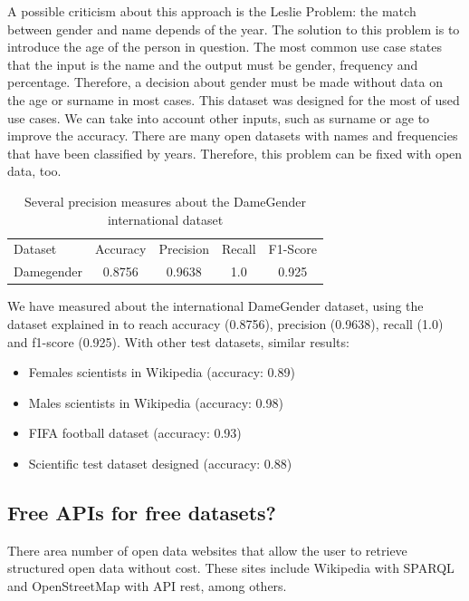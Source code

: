 \documentclass[a4paper]{article}
\begin{document}
A possible criticism about this approach is the Leslie
Problem\cite{blevins2015jane}: the match between gender and name
depends of the year. The solution to this problem is to introduce the
age of the person in question. The most common use case states that
the input is the name and the output must be gender, frequency and
percentage. Therefore, a decision about gender must be made without
data on the age or surname in most cases. This dataset was designed for
the most of used use cases. We can take into account other inputs,
such as surname or age to improve the accuracy. There are many open
datasets with names and frequencies that have been classified by years.
Therefore, this problem can be fixed with open data, too.

\begin{table}[t]
\footnotesize
\begin{tabular}[]{lcccc}
  \hline
  Dataset  & Accuracy & Precision & Recall & F1-Score  \tabularnewline
  Damegender &  0.8756  & 0.9638    & 1.0    & 0.925  \tabularnewline
  \hline
\end{tabular}
\caption{Several precision measures about the DameGender international dataset}
\label{table:DifferentAccuracyMeasures}
\end{table}

We have measured about the international DameGender dataset,
using the dataset explained in
\cite{10.7717/peerj-cs.156} to reach accuracy (0.8756), precision
(0.9638), recall (1.0) and f1-score (0.925). With other test datasets,
similar results:

\begin{itemize}
\item Females scientists in Wikipedia (accuracy: 0.89)
\item Males scientists in Wikipedia (accuracy: 0.98)
\item FIFA football dataset (accuracy: 0.93)
\item Scientific test dataset designed\cite{sebo2021performance} (accuracy: 0.88)
\end{itemize}


\subsection{Free APIs for free datasets?}
\label{sec:freeapis}

There area number of open data websites that allow the user to retrieve structured open data without cost. These sites include Wikipedia with SPARQL and OpenStreetMap with API rest, among others.
\end{document}
